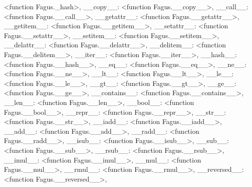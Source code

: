 \documentclass[a4paper,10pt,english]{sphinxmanual}
\begin{document}
\begin{fulllineitems}
\begin{fulllineitems}
\textless{}function Fagus.\_hash\textgreater{}, \textquotesingle{}\_\_copy\_\_\textquotesingle{}: \textless{}function Fagus.\_\_copy\_\_\textgreater{}, \textquotesingle{}\_\_call\_\_\textquotesingle{}: \textless{}function Fagus.\_\_call\_\_\textgreater{}, \textquotesingle{}\_\_getattr\_\_\textquotesingle{}: \textless{}function Fagus.\_\_getattr\_\_\textgreater{}, \textquotesingle{}\_\_getitem\_\_\textquotesingle{}: \textless{}function Fagus.\_\_getitem\_\_\textgreater{}, \textquotesingle{}\_\_setattr\_\_\textquotesingle{}: \textless{}function Fagus.\_\_setattr\_\_\textgreater{}, \textquotesingle{}\_\_setitem\_\_\textquotesingle{}: \textless{}function Fagus.\_\_setitem\_\_\textgreater{}, \textquotesingle{}\_\_delattr\_\_\textquotesingle{}: \textless{}function Fagus.\_\_delattr\_\_\textgreater{}, \textquotesingle{}\_\_delitem\_\_\textquotesingle{}: \textless{}function Fagus.\_\_delitem\_\_\textgreater{}, \textquotesingle{}\_\_iter\_\_\textquotesingle{}: \textless{}function Fagus.\_\_iter\_\_\textgreater{}, \textquotesingle{}\_\_hash\_\_\textquotesingle{}: \textless{}function Fagus.\_\_hash\_\_\textgreater{}, \textquotesingle{}\_\_eq\_\_\textquotesingle{}: \textless{}function Fagus.\_\_eq\_\_\textgreater{}, \textquotesingle{}\_\_ne\_\_\textquotesingle{}: \textless{}function Fagus.\_\_ne\_\_\textgreater{}, \textquotesingle{}\_\_lt\_\_\textquotesingle{}: \textless{}function Fagus.\_\_lt\_\_\textgreater{}, \textquotesingle{}\_\_le\_\_\textquotesingle{}: \textless{}function Fagus.\_\_le\_\_\textgreater{}, \textquotesingle{}\_\_gt\_\_\textquotesingle{}: \textless{}function Fagus.\_\_gt\_\_\textgreater{}, \textquotesingle{}\_\_ge\_\_\textquotesingle{}: \textless{}function Fagus.\_\_ge\_\_\textgreater{}, \textquotesingle{}\_\_contains\_\_\textquotesingle{}: \textless{}function Fagus.\_\_contains\_\_\textgreater{}, \textquotesingle{}\_\_len\_\_\textquotesingle{}: \textless{}function Fagus.\_\_len\_\_\textgreater{}, \textquotesingle{}\_\_bool\_\_\textquotesingle{}: \textless{}function Fagus.\_\_bool\_\_\textgreater{}, \textquotesingle{}\_\_repr\_\_\textquotesingle{}: \textless{}function Fagus.\_\_repr\_\_\textgreater{}, \textquotesingle{}\_\_str\_\_\textquotesingle{}: \textless{}function Fagus.\_\_str\_\_\textgreater{}, \textquotesingle{}\_\_iadd\_\_\textquotesingle{}: \textless{}function Fagus.\_\_iadd\_\_\textgreater{}, \textquotesingle{}\_\_add\_\_\textquotesingle{}: \textless{}function Fagus.\_\_add\_\_\textgreater{}, \textquotesingle{}\_\_radd\_\_\textquotesingle{}: \textless{}function Fagus.\_\_radd\_\_\textgreater{}, \textquotesingle{}\_\_isub\_\_\textquotesingle{}: \textless{}function Fagus.\_\_isub\_\_\textgreater{}, \textquotesingle{}\_\_sub\_\_\textquotesingle{}: \textless{}function Fagus.\_\_sub\_\_\textgreater{}, \textquotesingle{}\_\_rsub\_\_\textquotesingle{}: \textless{}function Fagus.\_\_rsub\_\_\textgreater{}, \textquotesingle{}\_\_imul\_\_\textquotesingle{}: \textless{}function Fagus.\_\_imul\_\_\textgreater{}, \textquotesingle{}\_\_mul\_\_\textquotesingle{}: \textless{}function Fagus.\_\_mul\_\_\textgreater{}, \textquotesingle{}\_\_rmul\_\_\textquotesingle{}: \textless{}function Fagus.\_\_rmul\_\_\textgreater{}, \textquotesingle{}\_\_reversed\_\_\textquotesingle{}: \textless{}function Fagus.\_\_reversed\_\_\textgreater{}, 
\end{fulllineitems}
\end{fulllineitems}
\end{document}
